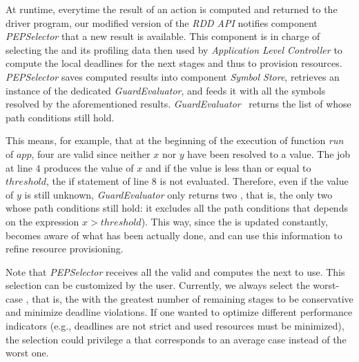 At runtime, everytime the result of an action is computed and returned to the driver program, our modified version of the  \textit{RDD API} notifies component \textit{PEPSelector} that a new result is available. This component is in charge of selecting the \plan and its profiling data then used by \textit{Application Level Controller} to compute the local deadlines for the next stages and thus to provision resources. \textit{PEPSelector} saves computed results into component \textit{Symbol Store}, retrieves an instance of the dedicated \textit{GuardEvaluator}, and feeds it with all the symbols resolved 
by the aforementioned results. \textit{GuardEvaluator}~\cite{Baresi-Quattrocchi-Denaro:2019} returns the list of \plan whose path conditions still hold.

This means, for example, that at the beginning of the execution of function \textit{run} of $app$, four \plans are valid since neither $x$ nor $y$ have been resolved to a value. The job at line $4$ produces the value of $x$ and if the value is less than or equal to $threshold$,  the if statement of line $8$ is not evaluated. Therefore, even if the value of $y$ is still unknown, \textit{GuardEvaluator} only returns two \plans, that is, the only two \plans whose path conditions still hold: it excludes all the path conditions that depends on the expression $x > threshold$). This way, since the \plan is updated constantly, \cSpark becomes aware of what has been actually done, and can use this information to refine resource provisioning.  

Note that \textit{PEPSelector} receives all the valid \plans and computes the next \plan to use. This selection can be customized by the user. Currently, we always select the worst-case \plan, that is, the \plan with the greatest number of remaining stages to be conservative and minimize deadline violations. If one wanted to optimize different performance indicators (e.g., deadlines are not strict and used resources must be minimized), the selection could privilege a \plan that corresponds to an average case instead of the worst one.

